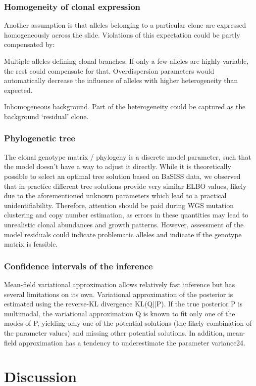 \subsubsection*{Homogeneity of clonal expression}
Another assumption is that alleles belonging to a particular clone are expressed homogeneously across the slide. Violations of this expectation could be partly compensated by:

Multiple alleles defining clonal branches. If only a few alleles are highly variable, the rest could compensate for that. Overdispersion parameters would automatically decrease the influence of alleles with higher heterogeneity than expected.

Inhomogeneous background. Part of the heterogeneity could be captured as the background ‘residual’ clone.

\subsubsection*{Phylogenetic tree}
The clonal genotype matrix / phylogeny is a discrete model parameter, such that the model doesn’t have a way to adjust it directly. While it is theoretically possible to select an optimal tree solution based on BaSISS data, we observed that in practice different tree solutions provide very similar \ac{ELBO} values, likely due to the aforementioned unknown parameters which lead to a practical unidentifiability. Therefore, attention should be paid during WGS mutation clustering and copy number estimation, as errors in these quantities may lead to unrealistic clonal abundances and growth patterns. However, assessment of the model residuals could indicate problematic alleles and indicate if the genotype matrix is feasible.

\subsubsection*{Confidence intervals of the inference}
Mean-field variational approximation allows relatively fast inference but has several limitations on its own. Variational approximation of the posterior is estimated using the reverse-KL divergence KL(Q||P). If the true posterior P is multimodal, the variational approximation Q is known to fit only one of the modes of P, yielding only one of the potential solutions (the likely combination of the parameter values) and missing other potential solutions. In addition, mean-field approximation has a tendency to underestimate the parameter variance24.


\section{Discussion}
